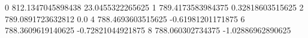 0 812.1347045898438 23.0455322265625
1 789.4173583984375 0.32818603515625
2 789.0891723632812 0.0
4 788.4693603515625 -0.61981201171875
6 788.3609619140625 -0.72821044921875
8 788.060302734375 -1.02886962890625
